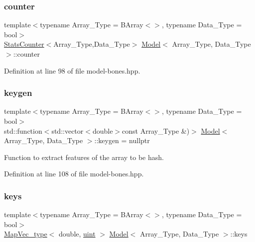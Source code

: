 \subsubsection{\texorpdfstring{counter}{counter}}
{\footnotesize\ttfamily template$<$typename Array\+\_\+\+Type  = B\+Array$<$$>$, typename Data\+\_\+\+Type  = bool$>$ \\
\hyperlink{class_stats_counter}{Stats\+Counter}$<$Array\+\_\+\+Type,Data\+\_\+\+Type$>$ \hyperlink{class_model}{Model}$<$ Array\+\_\+\+Type, Data\+\_\+\+Type $>$\+::counter}



Definition at line 98 of file model-\/bones.\+hpp.

\mbox{\label{class_model_a087db7c5e2ee47f4353d2e181223dd5a}} 
\subsubsection{\texorpdfstring{keygen}{keygen}}
{\footnotesize\ttfamily template$<$typename Array\+\_\+\+Type  = B\+Array$<$$>$, typename Data\+\_\+\+Type  = bool$>$ \\
std\+::function$<$std\+::vector$<$double$>$const Array\+\_\+\+Type \&)$>$ \hyperlink{class_model}{Model}$<$ Array\+\_\+\+Type, Data\+\_\+\+Type $>$\+::keygen = nullptr}



Function to extract features of the array to be hash. 



Definition at line 108 of file model-\/bones.\+hpp.

\mbox{\label{class_model_a706e07b974a8d16cbdb363517d756f41}} 
\subsubsection{\texorpdfstring{keys}{keys}}
{\footnotesize\ttfamily template$<$typename Array\+\_\+\+Type  = B\+Array$<$$>$, typename Data\+\_\+\+Type  = bool$>$ \\
\hyperlink{typedefs_8hpp_a02ed8dec96bc528c8bc3d8cb3c4674a5}{Map\+Vec\+\_\+type}$<$ double, \hyperlink{typedefs_8hpp_a91ad9478d81a7aaf2593e8d9c3d06a14}{uint} $>$ \hyperlink{class_model}{Model}$<$ Array\+\_\+\+Type, Data\+\_\+\+Type $>$\+::keys}



